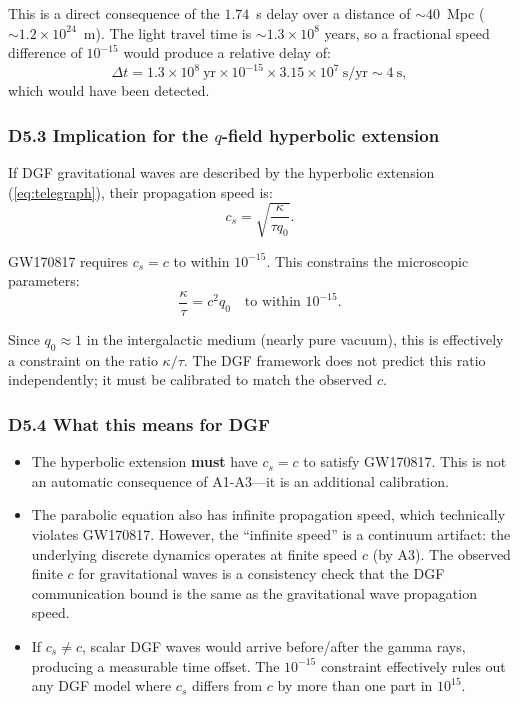 \documentclass[reprint]{revtex4-2}
\begin{document}
This is a direct consequence of the $1.74$~s delay over a distance of $\sim 40$~Mpc ($\sim 1.2\times 10^{24}$~m). The light travel time is $\sim 1.3\times 10^8$ years, so a fractional speed difference of $10^{-15}$ would produce a relative delay of:
\begin{equation}
\Delta t = 1.3\times 10^8~\text{yr} \times 10^{-15} \times 3.15\times 10^7~\text{s/yr} \sim 4~\text{s},
\end{equation}
which would have been detected.

\subsubsection{D5.3 Implication for the $q$-field hyperbolic extension}

If DGF gravitational waves are described by the hyperbolic extension (\ref{eq:telegraph}), their propagation speed is:
\begin{equation}
c_s = \sqrt{\frac{\kappa}{\tau q_0}}.
\end{equation}

GW170817 requires $c_s = c$ to within $10^{-15}$. This constrains the microscopic parameters:
\begin{equation}
\frac{\kappa}{\tau} = c^2 q_0 \quad \text{to within } 10^{-15}.
\end{equation}

Since $q_0 \approx 1$ in the intergalactic medium (nearly pure vacuum), this is effectively a constraint on the ratio $\kappa/\tau$. The DGF framework does not predict this ratio independently; it must be calibrated to match the observed $c$.

\subsubsection{D5.4 What this means for DGF}

\begin{itemize}
\item The hyperbolic extension \textbf{must} have $c_s = c$ to satisfy GW170817. This is not an automatic consequence of A1-A3---it is an additional calibration.
\item The parabolic equation also has infinite propagation speed, which technically violates GW170817. However, the ``infinite speed'' is a continuum artifact: the underlying discrete dynamics operates at finite speed $c$ (by A3). The observed finite $c$ for gravitational waves is a consistency check that the DGF communication bound is the same as the gravitational wave propagation speed.
\item If $c_s \neq c$, scalar DGF waves would arrive before/after the gamma rays, producing a measurable time offset. The $10^{-15}$ constraint effectively rules out any DGF model where $c_s$ differs from $c$ by more than one part in $10^{15}$.
\end{itemize}
\end{document}
